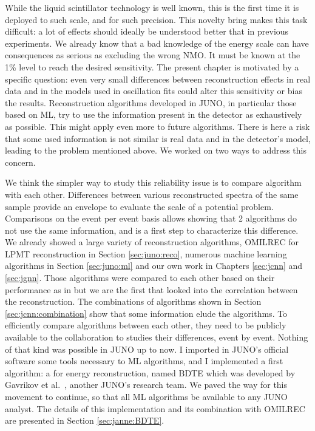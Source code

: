\documentclass[../main.tex]{subfiles}
\begin{document}
While the liquid scintillator technology is well known, this is the first time it is deployed to such scale, and for such precision. This novelty bring makes this task difficult: a lot of effects should ideally be understood better that in previous experiments.
We already know that a bad knowledge of the energy scale can have consequences as serious as excluding the wrong NMO. It must be known at the 1\% level to reach the desired sensitivity. The present chapter is motivated by a specific question: even very small differences between reconstruction effects in real data and in the models used in oscillation fits could alter this sensitivity or bias the results. Reconstruction algorithms developed in JUNO, in particular those based on ML, try to use the information present in the detector as exhaustively as possible. This might apply even more to future algorithms. There is here a risk that some used information is not similar is real data and in the detector's model, leading to the problem mentioned above. We worked on two ways to address this concern.

We think the simpler way to study this reliability issue is to compare algorithm with each other. Differences between various reconstructed spectra of the same sample provide an envelope to evaluate the scale of a potential problem. Comparisons on the event per event basis allows showing that 2 algorithms do not use the same information, and is a first step to characterize this difference.
We already showed a large variety of reconstruction algorithms, OMILREC for LPMT reconstruction in Section \ref{sec:juno:reco}, numerous machine learning algorithms in Section \ref{sec:juno:ml} and our own work in Chapters \ref{sec:jcnn} and \ref{sec:jgnn}. Those algorithms were compared to each other based on their performance as in \cite{qian_vertex_2021} but we are the first that looked into the correlation between the reconstruction. The combinations of algorithms shown in Section \ref{sec:jcnn:combination} show that some information elude the algorithms. To efficiently compare algorithms between each other, they need to be publicly available to the collaboration to studies their differences, event by event.
Nothing of that kind was possible in JUNO up to now. I imported in JUNO's official software some tools necessary to ML algorithms, and I implemented a first algorithm:  a for energy reconstruction, named BDTE which was developed by Gavrikov et al.\ \cite{gavrikov_energy_2022}, another JUNO's research team. We paved the way for this movement to continue, so that all ML algorithms be available to any JUNO analyst. The details of this implementation and its combination with OMILREC are presented in Section \ref{sec:janne:BDTE}.
\end{document}
